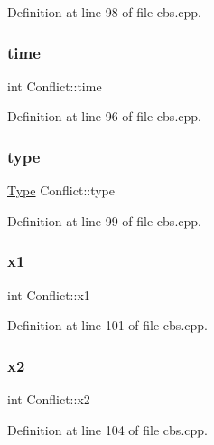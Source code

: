 Definition at line 98 of file cbs.\+cpp.

\mbox{\label{struct_conflict_a1c5e5967fe6b6f20a67910df06a4133f}} 
\subsubsection{\texorpdfstring{time}{time}}
{\footnotesize\ttfamily int Conflict\+::time}



Definition at line 96 of file cbs.\+cpp.

\mbox{\label{struct_conflict_acf201248af61ee8fad8e1e806df12172}} 
\subsubsection{\texorpdfstring{type}{type}}
{\footnotesize\ttfamily \hyperlink{struct_conflict_aee4228c4b31f415064213a2bbebe3eb6}{Type} Conflict\+::type}



Definition at line 99 of file cbs.\+cpp.

\mbox{\label{struct_conflict_a9a1d3928989b17b8c5785a6d7fd335fa}} 
\subsubsection{\texorpdfstring{x1}{x1}}
{\footnotesize\ttfamily int Conflict\+::x1}



Definition at line 101 of file cbs.\+cpp.

\mbox{\label{struct_conflict_a8a31ca7b4e951e2fc111def844b81d7e}} 
\subsubsection{\texorpdfstring{x2}{x2}}
{\footnotesize\ttfamily int Conflict\+::x2}



Definition at line 104 of file cbs.\+cpp.

